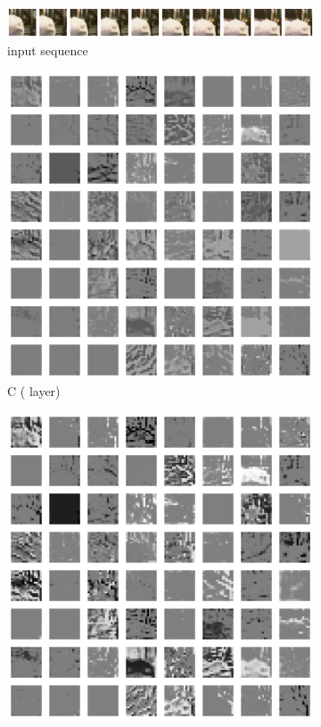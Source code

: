 \begin{figure}[h!tb]
\centering
\begin{subfigure}{1.0\textwidth}
  \centering
  \includegraphics[width=0.92\linewidth]{figures/learned_rep/ucf/inputs.png}
  \caption{input sequence}
  \label{fig:ucf-lrep-inputs}
  \vspace{.1cm}
\end{subfigure}
\begin{subfigure}{0.24\textwidth}
  \centering
  \includegraphics[width=0.92\linewidth]{figures/learned_rep/ucf/1c.png}
  \caption{C \tiny{( layer)}}
  \label{fig:ucf-lrep1}
  \vspace{.1cm}
\end{subfigure}
\begin{subfigure}{0.24\textwidth}
  \centering
  \includegraphics[width=0.92\linewidth]{figures/learned_rep/ucf/1h.png}

\end{subfigure}
\end{figure}
